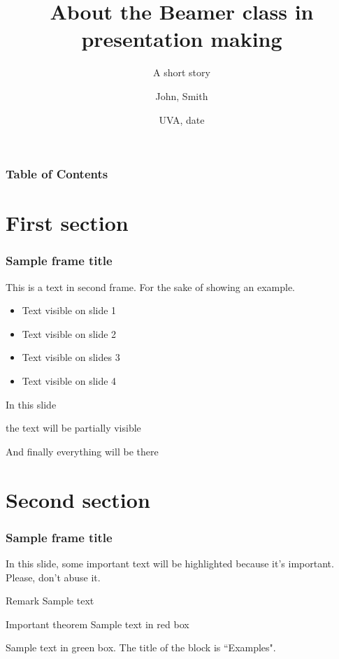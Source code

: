 \documentclass[unknownkeysallowed,xcolor=dvipsnames]{beamer}
\title[About Beamer] %
{About the Beamer class in presentation making}
\subtitle{A short story}
\author[John, Smith] %
{John, Smith}
\institute[UVA] %
{
  University of Virginia
}
\date[UVA-] %
{UVA, date}
\begin{document}
\frame{\titlepage}


\begin{frame}
\frametitle{Table of Contents}
\tableofcontents
\end{frame}


\section{First section}

\begin{frame}
\frametitle{Sample frame title}
This is a text in second frame. For the sake of showing an example.

\begin{itemize}
    \item<1-> Text visible on slide 1
    \item<2-> Text visible on slide 2
    \item<3> Text visible on slides 3
    \item<4-> Text visible on slide 4
\end{itemize}
\end{frame}



\begin{frame}
In this slide \pause

the text will be partially visible \pause

And finally everything will be there
\end{frame}

\section{Second section}

\begin{frame}
\frametitle{Sample frame title}

In this slide, some important text will be
\alert{highlighted} because it's important.
Please, don't abuse it.

\begin{block}{Remark}
Sample text
\end{block}

\begin{alertblock}{Important theorem}
Sample text in red box
\end{alertblock}

\begin{examples}
Sample text in green box. The title of the block is ``Examples".
\end{examples}
\end{frame}
\end{document}
